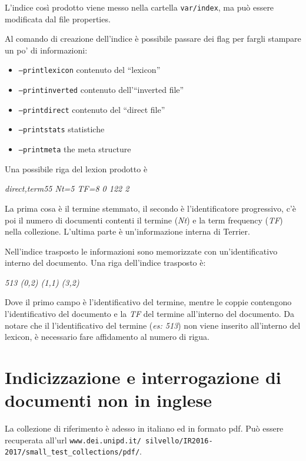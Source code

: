 \noindent L'indice così prodotto viene messo nella cartella \texttt{var/index}, ma può essere modificata dal file properties.

Al comando di creazione dell'indice è possibile passare dei flag per fargli stampare un po' di informazioni:

\begin{itemize}
	\item \texttt{--printlexicon} contenuto del ``lexicon''
	\item \texttt{--printinverted} contenuto dell'``inverted file''
	\item \texttt{--printdirect} contenuto del ``direct file''
	\item \texttt{--printstats} statistiche
	\item \texttt{--printmeta} the meta structure
\end{itemize}

\noindent Una possibile riga del lexion prodotto è

\begin{center}
	\textit{direct,term55 Nt=5 TF=8 \@{0 122 2}}
\end{center}

\noindent La prima cosa è il termine stemmato, il secondo è l'identificatore progressivo, c'è poi il numero di documenti contenti il termine (\textit{Nt}) e la term frequency (\textit{TF}) nella collezione. L'ultima parte è un'informazione interna di Terrier.

Nell'indice trasposto le informazioni sono memorizzate con un'identificativo interno del documento.
Una riga dell'indice trasposto è:

\begin{center}
	\textit{513 (0,2) (1,1) (3,2)}
\end{center}

\noindent Dove il primo campo è l'identificativo del termine, mentre le coppie contengono l'identificativo del documento e la \textit{TF} del termine all'interno del documento.
Da notare che il l'identificativo del termine (\textit{es: 513}) non viene inserito all'interno del lexicon, è necessario fare affidamento al numero di rigua.

\section{Indicizzazione e interrogazione di documenti non in inglese}

La collezione di riferimento è adesso in italiano ed in formato pdf. Può essere recuperata all'url \texttt{www.dei.unipd.it/~silvello/IR2016-2017/small\_test\_collections/pdf/}.

